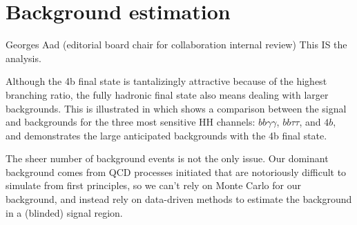 \chapter{Background estimation}
\label{ch:bkg-est}

\begin{chapquote}{Georges Aad (editorial board chair for collaboration internal review)}
{This IS the analysis.}
\end{chapquote}

\noindent
\begin{minipage}{0.38\textwidth}
Although the 4b final state is tantalizingly attractive because of the highest \HH branching ratio,  the fully hadronic final state also means dealing with larger backgrounds. This is illustrated in \Fig{\ref{fig:hh-chan-breakdown}} which shows a comparison between the signal and backgrounds for the three most sensitive HH channels: $bb\gamma\gamma$, $bb\tau\tau$, and $4b$, and demonstrates the large anticipated backgrounds with the 4b final state.

The sheer number of background events is not the only issue. Our dominant background comes from QCD processes initiated that are notoriously difficult to simulate from first principles, so we can't rely on Monte Carlo for our background, and instead rely on data-driven methods to estimate the background in a (blinded) signal region.
\end{minipage}
\hspace{0.02\textwidth}
